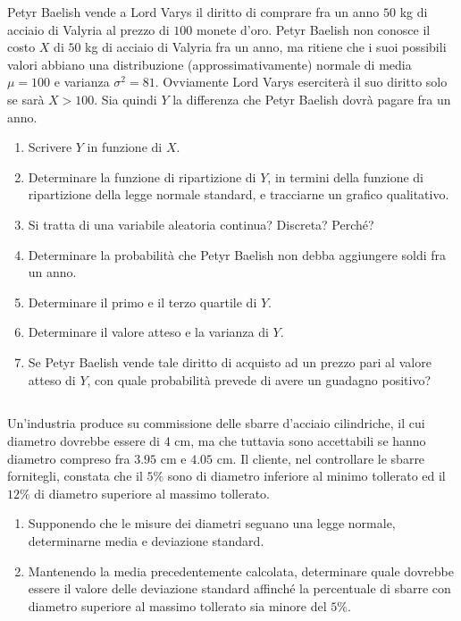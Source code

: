 Petyr Baelish vende a Lord Varys il diritto di comprare fra un anno $50$ kg di acciaio di Valyria al prezzo di $100$ monete d'oro. Petyr Baelish non conosce il costo $X$ di $50$ kg di acciaio di Valyria fra un anno, ma ritiene che i suoi possibili valori abbiano una distribuzione (approssimativamente) normale di media $\mu =100$ e varianza $\sigma ^{2} =81$. Ovviamente Lord Varys eserciterà il suo diritto solo se sarà $X >100$. Sia quindi $Y$ la differenza che Petyr Baelish dovrà pagare fra un anno.
\begin{enumerate}
\item Scrivere $Y$ in funzione di $X$.
\item Determinare la funzione di ripartizione di $Y$, in termini della funzione di ripartizione della legge normale standard, e tracciarne un grafico qualitativo.
\item Si tratta di una variabile aleatoria continua? Discreta? Perché?
\item Determinare la probabilità che Petyr Baelish non debba aggiungere soldi fra un anno.
\item Determinare il primo e il terzo quartile di $Y$.
\item Determinare il valore atteso e la varianza di $Y$.
\item Se Petyr Baelish vende tale diritto di acquisto ad un prezzo pari al valore atteso di $Y$, con quale probabilità prevede di avere un guadagno positivo?
\end{enumerate}
\subsection{}

Un'industria produce su commissione delle sbarre d'acciaio cilindriche, il cui diametro dovrebbe essere di $4$ cm, ma che tuttavia sono accettabili se hanno diametro compreso fra $3.95$ cm e $4.05$ cm. Il cliente, nel controllare le sbarre fornitegli, constata che il $5\%$ sono di diametro inferiore al minimo tollerato ed il $12\%$ di diametro superiore al massimo tollerato.
\begin{enumerate}
\item Supponendo che le misure dei diametri seguano una legge normale, determinarne media e deviazione standard.
\item Mantenendo la media precedentemente calcolata, determinare quale dovrebbe essere il valore delle deviazione standard affinché la percentuale di sbarre con diametro superiore al massimo tollerato sia minore del $5\%$.
\end{enumerate}
